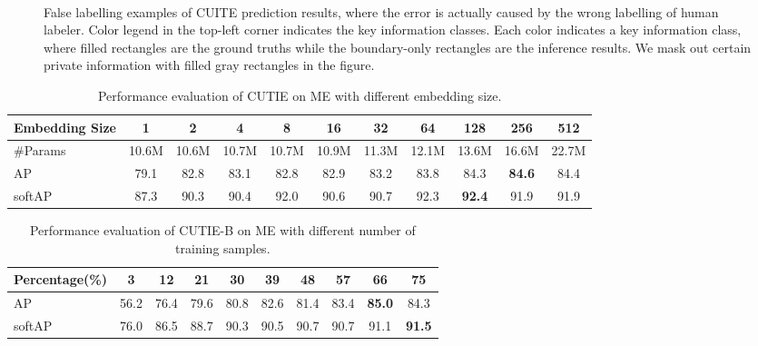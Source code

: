 \documentclass[10pt,twocolumn,letterpaper]{article}
\begin{document}
\begin{figure}
\begin{center}
\\
\end{center}
   \caption{False labelling examples of CUITE prediction results, where the error is actually caused by the wrong labelling of human labeler. Color legend in the top-left corner indicates the key information classes. Each color indicates a key information class, where filled rectangles are the ground truths while the boundary-only rectangles are the inference results. We mask out certain private information with filled gray rectangles in the figure.}
\label{fig:falselabel}
\end{figure}

\begin{table}
	\caption{Performance evaluation of CUTIE on ME with different embedding size.}
\begin{center}
\begin{tabular}{l | c | c | c | c | c | c | c | c | c | c}
	Embedding Size & 1 & 2 & 4 & 8 & 16 & 32 & 64 & 128 & 256 & 512 \\
	\hline
	\#Params & 10.6M & 10.6M & 10.7M & 10.7M & 10.9M & 11.3M & 12.1M & 13.6M & 16.6M & 22.7M \\
	AP & 79.1 & 82.8 & 83.1 & 82.8 & 82.9 & 83.2 & 83.8 & 84.3 & \textbf{84.6} & 84.4 \\
	softAP & 87.3 & 90.3 & 90.4 & 92.0 & 90.6 & 90.7 & 92.3 & \textbf{92.4} & 91.9 & 91.9 \\
\end{tabular}
\end{center}
	\label{tab:embedding}
\end{table}

\begin{table}
	\caption{Performance evaluation of CUTIE-B on ME with different number of training samples.}
\begin{center}
\begin{tabular}{l | c | c | c | c | c | c | c | c | c}
	Percentage(\%) & 3 & 12 & 21 & 30 & 39 & 48 & 57 & 66 & 75 \\
	\hline
	AP & 56.2 & 76.4 & 79.6 & 80.8 & 82.6 & 81.4 & 83.4 & \textbf{85.0} & 84.3 \\
	softAP & 76.0 & 86.5 & 88.7 & 90.3 & 90.5 & 90.7 & 90.7 & 91.1 & \textbf{91.5} \\
\end{tabular}
\end{center}
	\label{tab:samples}
\end{table}
\end{document}
